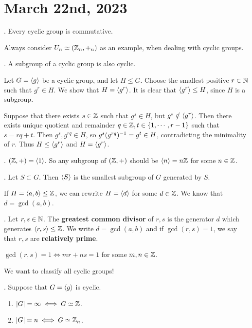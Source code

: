 \section*{March 22nd, 2023}


\thm. Every cyclic group is commutative.

Always consider \(U_n \simeq (\mathbb{Z}_n, +_n)\) as an example, when dealing with cyclic groups.

\thm. A subgroup of a cyclic group is also cyclic.

\pf Let \(G = \left\langle g \right\rangle\) be a cyclic group, and let \(H \leq G\). Choose the smallest positive \(r \in \mathbb{N}\) such that \(g^r \in H\). We show that \(H = \left\langle g^r \right\rangle\). It is clear that \(\left\langle g^r \right\rangle \leq H\), since \(H\) is a subgroup.

Suppose that there exists \(s \in \mathbb{Z}\) such that \(g^s \in H\), but \(g^s \notin \left\langle g^r \right\rangle\). Then there exists unique quotient and remainder \(q \in \mathbb{Z}, t \in \{1, \cdots, r - 1\}\) such that \(s = rq + t\). Then \(g^s, g^{rq} \in H\), so \(g^s(g^{rq})^{-1} = g^t \in H\), contradicting the minimality of \(r\). Thus \(H \leq \left\langle g^r \right\rangle\) and \(H = \left\langle g^r \right\rangle\).

\ex. \((\mathbb{Z}, +) = \left\langle 1 \right\rangle\). So any subgroup of \((\mathbb{Z}, +)\) should be \(\left\langle n \right\rangle = n\mathbb{Z}\) for some \(n \in \mathbb{Z}\).

. Let \(S \subset G\). Then \(\left\langle S \right\rangle\) is the smallest subgroup of \(G\) generated by \(S\).

If \(H = \left\langle a, b \right\rangle \leq \mathbb{Z}\), we can rewrite \(H = \left\langle d \right\rangle\) for some \(d \in \mathbb{Z}\). We know that \(d = \gcd(a, b)\).

.  Let \(r, s \in \mathbb{N}\). The \textbf{greatest common divisor} of \(r, s\) is the generator \(d\) which generates \(\left\langle r, s \right\rangle \leq \mathbb{Z}\). We write \(d = \gcd(a, b)\) and if \(\gcd(r, s) = 1\), we say that \(r, s\) are \textbf{relatively prime}.

\rmk \(\gcd(r, s) = 1 \iff mr + ns = 1\) for some \(m, n \in \mathbb{Z}\).

We want to classify all cyclic groups!

\thm.  Suppose that \(G = \left\langle g \right\rangle\) is cyclic.
\begin{enumerate}
    \item \(\left| G \right| = \infty \iff G \simeq \mathbb{Z}\).
    \item \(\left| G \right| = n \iff G \simeq \mathbb{Z}_n\).
\end{enumerate}

